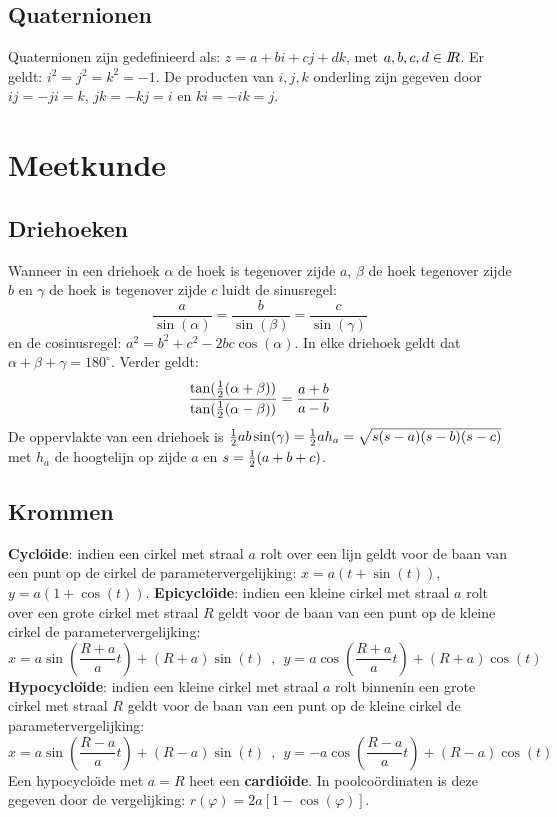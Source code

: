 \subsection{Quaternionen}
Quaternionen zijn gedefinieerd als: $z=a+bi+cj+dk$, met $a,b,c,d\in I\hspace{-1mm}R$.
Er geldt: $i^2=j^2=k^2=-1$. De producten van $i,j,k$ onderling zijn gegeven
door $ij=-ji=k$, $jk=-kj=i$ en $ki=-ik=j$.

\section{Meetkunde}
\subsection{Driehoeken}
Wanneer in een driehoek $\alpha$ de hoek is tegenover zijde $a$, $\beta$ de
hoek tegenover zijde $b$ en $\gamma$ de hoek is tegenover zijde $c$ luidt de
sinusregel:
\[
\frac{a}{\sin(\alpha)}=\frac{b}{\sin(\beta)}=\frac{c}{\sin(\gamma)}
\]
en de cosinusregel: $a^2=b^2+c^2-2bc\cos(\alpha)$. In elke driehoek geldt dat
$\alpha+\beta+\gamma=180^\circ$.
\npar
Verder geldt:
\[
\frac{\tan(\mbox{$\frac{1}{2}$}(\alpha+\beta))}{\tan(\mbox{$\frac{1}{2}$}(\alpha-\beta))}=\frac{a+b}{a-b}
\]
De oppervlakte van een driehoek is
$\mbox{$\frac{1}{2}$} ab\sin(\gamma)=\mbox{$\frac{1}{2}$} ah_a=\sqrt{s(s-a)(s-b)(s-c)}$ met $h_a$ de
hoogtelijn op zijde $a$ en $s=\mbox{$\frac{1}{2}$}(a+b+c)$.

\subsection{Krommen}
{\bf Cyclo\"{\i}de}: indien een cirkel met straal $a$ rolt over een
lijn geldt voor de baan van een punt op de cirkel de parametervergelijking:
$x=a(t+\sin(t))$, $y=a(1+\cos(t))$.
\npar
{\bf Epicyclo\"{\i}de}: indien een kleine cirkel met straal $a$ rolt over een
grote cirkel met straal $R$ geldt voor de baan van een punt op de kleine
cirkel de parametervergelijking:
\[
x=a\sin\left(\frac{R+a}{a}t\right)+(R+a)\sin(t)~~,~~
y=a\cos\left(\frac{R+a}{a}t\right)+(R+a)\cos(t)
\]
{\bf Hypocyclo\"{\i}de}: indien een kleine cirkel met straal $a$ rolt
binnenin een grote cirkel met straal $R$ geldt voor de baan van een punt op
de kleine cirkel de parametervergelijking:
\[
x=a\sin\left(\frac{R-a}{a}t\right)+(R-a)\sin(t)~~,~~
y=-a\cos\left(\frac{R-a}{a}t\right)+(R-a)\cos(t)
\]
Een hypocyclo\"{\i}de met $a=R$ heet een {\bf cardio\"{\i}de}. In
poolco\"ordinaten is deze gegeven door de vergelijking:
$r(\varphi)=2a[1-\cos(\varphi)]$.

